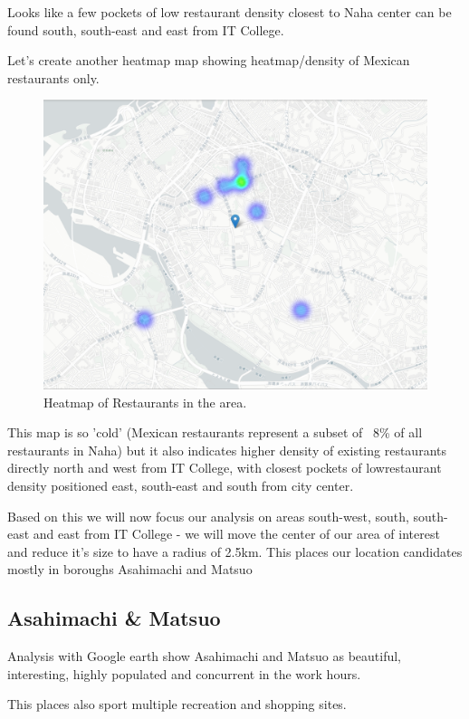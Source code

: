 \documentclass[11pt]{article}
\begin{document}
Looks like a few pockets of low restaurant density closest to Naha center can be found south, south-east and east from IT College.

Let's create another heatmap map showing heatmap/density of Mexican restaurants only.

\begin{figure}[H]
    \centering
        \includegraphics[scale=.4]{figures/cm5.png}
    \caption{Heatmap of Restaurants in the area.}
    \label{fig:1}
\end{figure}

This map is so 'cold' (Mexican restaurants represent a subset of ~8\% of all restaurants in Naha) but it also indicates higher density of existing restaurants directly north and west from IT College, with closest pockets of lowrestaurant density positioned east, south-east and south from city center.

Based on this we will now focus our analysis on areas south-west, south, south-east and east from IT College - we will move the center of our area of interest and reduce it's size to have a radius of 2.5km. This places our location candidates mostly in boroughs Asahimachi and Matsuo

\subsection{Asahimachi \& Matsuo}

Analysis with Google earth show Asahimachi and Matsuo as beautiful, interesting, highly populated and concurrent in the work hours.

This places also sport multiple recreation and shopping sites.
\end{document}

